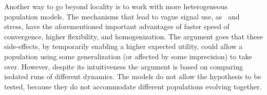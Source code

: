 \documentclass[a4paper]{article}
\begin{document}
Another way to go beyond locality is to work with more heterogeneous population models.
The mechanisms that lead to vague signal use, as~\textcite{oconnor_evolution_2014} and~\textcite{franke_vagueness_2017} stress, have the aforementioned important advantages of faster speed of convergence, higher flexibility, and homogenization.
The argument goes that these side-effects, by temporarily enabling a higher expected utility, could allow a population using some generalization (or affected by some imprecision) to take over.
However, despite its intuitiveness the argument is based on comparing isolated runs of different dynamics.
The models do not allow the hypothesis to be tested, because they do not accommodate different populations evolving together.
%
\end{document}

